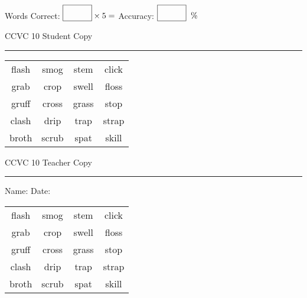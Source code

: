 \documentclass{memoir}
\begin{document}
\small

Words Correct: $\fbox{\phantom{\huge 100}} \times 5 = $ Accuracy: $\fbox{\phantom{\huge 100}}\;\; \%$ 

\vfill

\newpage


\footnotesize \noindent
CCVC 10 \hfill Student Copy
\smallskip
\hrule

\Large

\setlength{\tabcolsep}{14pt}
\def\arraystretch{3}

{\selectfont


\begin{vplace}[0.5]
\begin{center}
\begin{tabular}{cccc}
flash             & smog & stem & click             \\
grab                    & crop & swell & floss \\
gruff & cross & grass                    & stop \\
clash            & drip & trap & strap \\
broth    & scrub & spat            & skill \\
\end{tabular}
\end{center}
\end{vplace}

}

\newpage

\footnotesize \noindent
CCVC 10 \hfill Teacher Copy
\smallskip
\hrule

\small

\vfill

\noindent
Name: \underline{\hspace{1.75in}} \hfill Date: \underline{\hspace{1in}}

\Large

{\selectfont


\begin{vplace}[0.5]
\begin{center}
\begin{tabular}{cccc}
flash             & smog & stem & click             \\
grab                    & crop & swell & floss \\
gruff & cross & grass                    & stop \\
clash            & drip & trap & strap \\
broth    & scrub & spat            & skill \\
\end{tabular}
\end{center}
\end{vplace}



}
\end{document}
